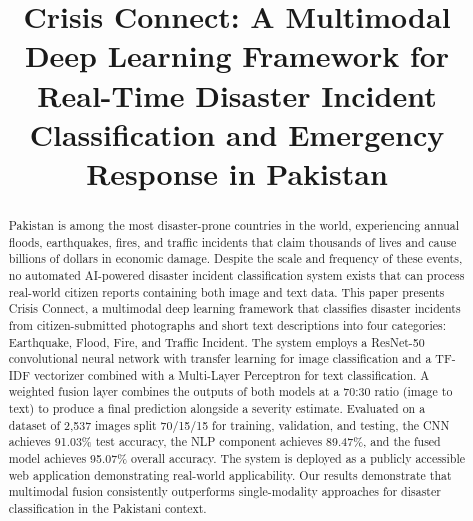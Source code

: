 \documentclass[conference]{IEEEtran}
\begin{document}
\title{Crisis Connect: A Multimodal Deep Learning Framework for Real-Time Disaster Incident Classification and Emergency Response in Pakistan}

\author{
}

\maketitle

\begin{abstract}
Pakistan is among the most disaster-prone countries in the world, experiencing annual floods, earthquakes, fires, and traffic incidents that claim thousands of lives and cause billions of dollars in economic damage. Despite the scale and frequency of these events, no automated AI-powered disaster incident classification system exists that can process real-world citizen reports containing both image and text data. This paper presents Crisis Connect, a multimodal deep learning framework that classifies disaster incidents from citizen-submitted photographs and short text descriptions into four categories: Earthquake, Flood, Fire, and Traffic Incident. The system employs a ResNet-50 convolutional neural network with transfer learning for image classification and a TF-IDF vectorizer combined with a Multi-Layer Perceptron for text classification. A weighted fusion layer combines the outputs of both models at a 70:30 ratio (image to text) to produce a final prediction alongside a severity estimate. Evaluated on a dataset of 2,537 images split 70/15/15 for training, validation, and testing, the CNN achieves 91.03\% test accuracy, the NLP component achieves 89.47\%, and the fused model achieves 95.07\% overall accuracy. The system is deployed as a publicly accessible web application demonstrating real-world applicability. Our results demonstrate that multimodal fusion consistently outperforms single-modality approaches for disaster classification in the Pakistani context.
\end{abstract}
\end{document}
